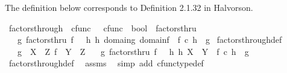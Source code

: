 \begin{isabellebody}
\isamarkupfalse%
%
\endisatagproof
{\isafoldproof}%
%
\isadelimproof
%
\endisadelimproof
%
\isadelimdocument
%
\endisadelimdocument
%
\isatagdocument
%
\isamarkuptrue%
%
\endisatagdocument
{\isafolddocument}%
%
\isadelimdocument
%
\endisadelimdocument
%
\begin{isamarkuptext}%
The definition below corresponds to Definition 2.1.32 in Halvorson.%
\end{isamarkuptext}\isamarkuptrue%
\isamarkupfalse%
\ factors{\isacharunderscore}{\kern0pt}through\ {\isacharcolon}{\kern0pt}{\isacharcolon}{\kern0pt}\ {\isachardoublequoteopen}cfunc\ \ {\isasymRightarrow}\ cfunc\ {\isasymRightarrow}\ bool{\isachardoublequoteclose}\ {\isacharparenleft}{\kern0pt}\ {\isachardoublequoteopen}factorsthru{\isachardoublequoteclose}\ {}{}{\isacharparenright}{\kern0pt}\isanewline
\ \ \ {\isachardoublequoteopen}g\ factorsthru\ f\ {\isasymlongleftrightarrow}\ {\isacharparenleft}{\kern0pt}{\isasymexists}\ h{\isachardot}{\kern0pt}\ {\isacharparenleft}{\kern0pt}h{\isacharcolon}{\kern0pt}\ domain{\isacharparenleft}{\kern0pt}g{\isacharparenright}{\kern0pt}{\isasymrightarrow}\ domain{\isacharparenleft}{\kern0pt}f{\isacharparenright}{\kern0pt}{\isacharparenright}{\kern0pt}\ {\isasymand}\ f\ {\isasymcirc}\isactrlsub c\ h\ {\isacharequal}{\kern0pt}\ g{\isacharparenright}{\kern0pt}{\isachardoublequoteclose}\isanewline
\isanewline
{}\isamarkupfalse%
\ factors{\isacharunderscore}{\kern0pt}through{\isacharunderscore}{\kern0pt}def{}{\isacharcolon}{\kern0pt}\isanewline
\ \ \ {\isachardoublequoteopen}g\ {\isacharcolon}{\kern0pt}\ X\ {\isasymrightarrow}\ Z{\isachardoublequoteclose}\ {\isachardoublequoteopen}f\ {\isacharcolon}{\kern0pt}\ Y\ {\isasymrightarrow}\ Z{\isachardoublequoteclose}\isanewline
\ \ \ {\isachardoublequoteopen}g\ factorsthru\ f\ {\isasymlongleftrightarrow}\ {\isacharparenleft}{\kern0pt}{\isasymexists}\ h{\isachardot}{\kern0pt}\ h{\isacharcolon}{\kern0pt}\ X\ {\isasymrightarrow}\ Y\ {\isasymand}\ f\ {\isasymcirc}\isactrlsub c\ h\ {\isacharequal}{\kern0pt}\ g{\isacharparenright}{\kern0pt}{\isachardoublequoteclose}\isanewline
%
\isadelimproof
\ \ %
\endisadelimproof
%
\isatagproof
{}\isamarkupfalse%
\ factors{\isacharunderscore}{\kern0pt}through{\isacharunderscore}{\kern0pt}def\ \isamarkupfalse%
\ assms\ \isamarkupfalse%
\ {\isacharparenleft}{\kern0pt}simp\ add{\isacharcolon}{\kern0pt}\ cfunc{\isacharunderscore}{\kern0pt}type{\isacharunderscore}{\kern0pt}def{\isacharparenright}{\kern0pt}%

\end{isabellebody}
